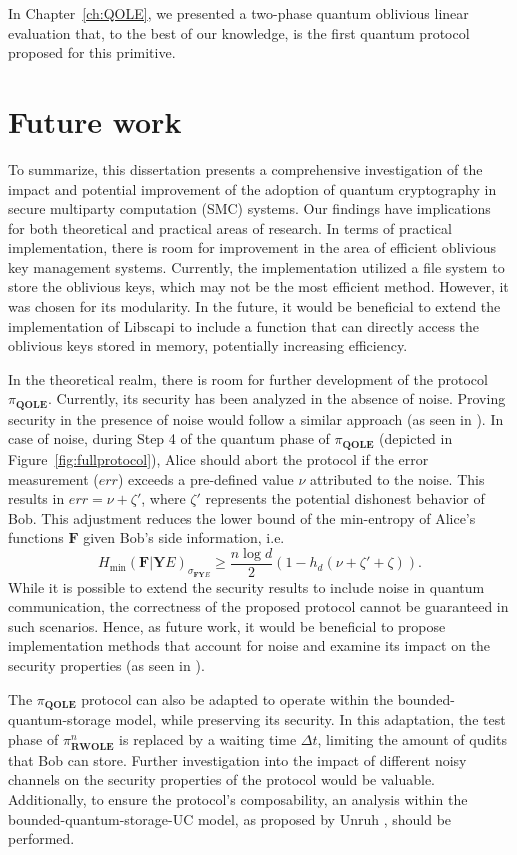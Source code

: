 In Chapter~\ref{ch:QOLE}, we presented a two-phase quantum oblivious linear evaluation that, to the best of our knowledge, is the first quantum protocol proposed for this primitive.

\section{Future work}

To summarize, this dissertation presents a comprehensive investigation of the impact and potential improvement of the adoption of quantum cryptography in secure multiparty computation (SMC) systems. Our findings have implications for both theoretical and practical areas of research. In terms of practical implementation, there is room for improvement in the area of efficient oblivious key management systems. Currently, the implementation utilized a file system to store the oblivious keys, which may not be the most efficient method. However, it was chosen for its modularity. In the future, it would be beneficial to extend the implementation of Libscapi to include a function that can directly access the oblivious keys stored in memory, potentially increasing efficiency.

In the theoretical realm, there is room for further development of the protocol $\pi_{\textbf{QOLE}}$. Currently, its security has been analyzed in the absence of noise. Proving security in the presence of noise would follow a similar approach (as seen in \cite{DFLSS09}). In case of noise, during Step 4 of the quantum phase of $\pi_{\textbf{QOLE}}$ (depicted in Figure~\ref{fig:fullprotocol}), Alice should abort the protocol if the error measurement ($err$) exceeds a pre-defined value $\nu$ attributed to the noise. This results in $err = \nu + \zeta '$, where $\zeta '$ represents the potential dishonest behavior of Bob. This adjustment reduces the lower bound of the min-entropy of Alice's functions $\mathbf{F}$ given Bob's side information, i.e.
$$H_{\min}(\mathbf{F} | \mathbf{Y} E)_{\sigma_{\mathbf{F}\mathbf{Y} E}} \geq \frac{n\log d}{2}\left(1 - h_d(\nu + \zeta ' + \zeta)\right).$$
While it is possible to extend the security results to include noise in quantum communication, the correctness of the proposed protocol cannot be guaranteed in such scenarios. Hence, as future work, it would be beneficial to propose implementation methods that account for noise and examine its impact on the security properties (as seen in \cite{BCDP21}).


The $\pi_{\textbf{QOLE}}$ protocol can also be adapted to operate within the bounded-quantum-storage model, while preserving its security. In this adaptation, the test phase of $\pi^n_{\textbf{RWOLE}}$ is replaced by a waiting time $\Delta t$, limiting the amount of qudits that Bob can store. Further investigation into the impact of different noisy channels on the security properties of the protocol would be valuable. Additionally, to ensure the protocol's composability, an analysis within the bounded-quantum-storage-UC model, as proposed by Unruh \cite{U11}, should be performed.

